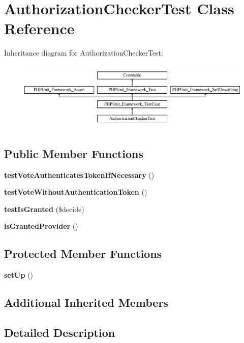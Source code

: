 \section{Authorization\+Checker\+Test Class Reference}
\label{class_symfony_1_1_component_1_1_security_1_1_core_1_1_tests_1_1_authorization_1_1_authorization_checker_test}
Inheritance diagram for Authorization\+Checker\+Test\+:\begin{figure}[H]
\begin{center}
\leavevmode
\includegraphics[height=3.303835cm]{class_symfony_1_1_component_1_1_security_1_1_core_1_1_tests_1_1_authorization_1_1_authorization_checker_test}
\end{center}
\end{figure}
\subsection*{Public Member Functions}
\begin{DoxyCompactItemize}
\item 
{\bf test\+Vote\+Authenticates\+Token\+If\+Necessary} ()
\item 
{\bf test\+Vote\+Without\+Authentication\+Token} ()
\item 
{\bf test\+Is\+Granted} (\$decide)
\item 
{\bf is\+Granted\+Provider} ()
\end{DoxyCompactItemize}
\subsection*{Protected Member Functions}
\begin{DoxyCompactItemize}
\item 
{\bf set\+Up} ()
\end{DoxyCompactItemize}
\subsection*{Additional Inherited Members}


\subsection{Detailed Description}


